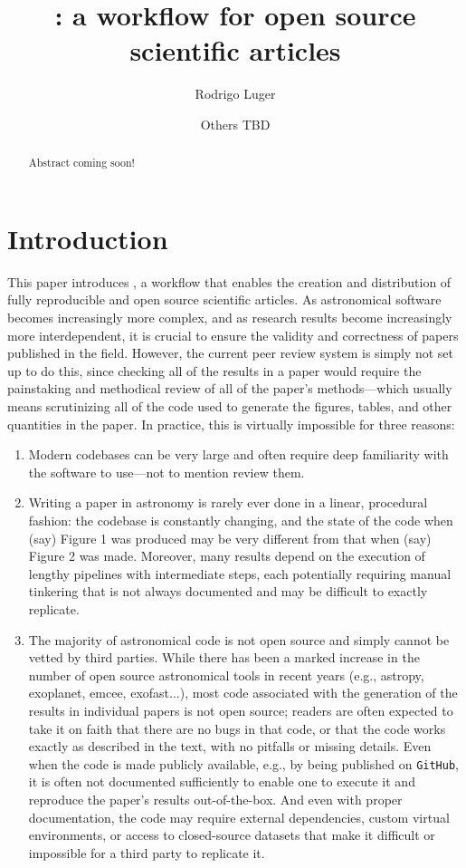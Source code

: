 \documentclass[twocolumn]{aastex631}
\begin{document}
\title{\showyourwork: a workflow for open source scientific articles}

\author[0000-0002-0296-3826]{Rodrigo Luger}
\author{Others TBD}

\begin{abstract}
    Abstract coming soon!
\end{abstract}

\section{Introduction}
\label{sec:intro}

This paper introduces \showyourwork, a workflow that enables the creation and distribution of fully reproducible and open source scientific articles. 
As astronomical software becomes increasingly more complex, and as research results become increasingly more interdependent, it is crucial to ensure the validity and correctness of papers published in the field.
However, the current peer review system is simply not set up to do this, since checking all of the results in a paper would require the painstaking and methodical review of all of the paper's methods—which usually means scrutinizing all of the code used to generate the figures, tables, and other quantities in the paper. 
In practice, this is virtually impossible for three reasons:

\begin{enumerate}
    \item Modern codebases can be very large and often require deep familiarity with the software to use—not to mention review them.
    \item  Writing a paper in astronomy is rarely ever done in a linear, procedural fashion: the codebase is constantly changing, and the state of the code when (say) Figure 1 was produced may be very different from that when (say) Figure 2 was made. 
    Moreover, many results depend on the execution of lengthy pipelines with intermediate steps, each potentially requiring manual tinkering that is not always documented and may be difficult to exactly replicate.
    \item The majority of astronomical code is not open source and simply cannot be vetted by third parties. 
    While there has been a marked increase in the number of open source astronomical tools in recent years (e.g., astropy, exoplanet, emcee, exofast...), most code associated with the generation of the results in individual papers is not open source; readers are often expected to take it on faith that there are no bugs in that code, or that the code works exactly as described in the text, with no pitfalls or missing details. 
    Even when the code is made publicly available, e.g., by being published on \texttt{GitHub}, it is often not documented sufficiently to enable one to execute it and reproduce the paper's results out-of-the-box. 
    And even with proper documentation, the code may require external dependencies, custom virtual environments, or access to closed-source datasets that make it difficult or impossible for a third party to replicate it.
\end{enumerate}
\end{document}
